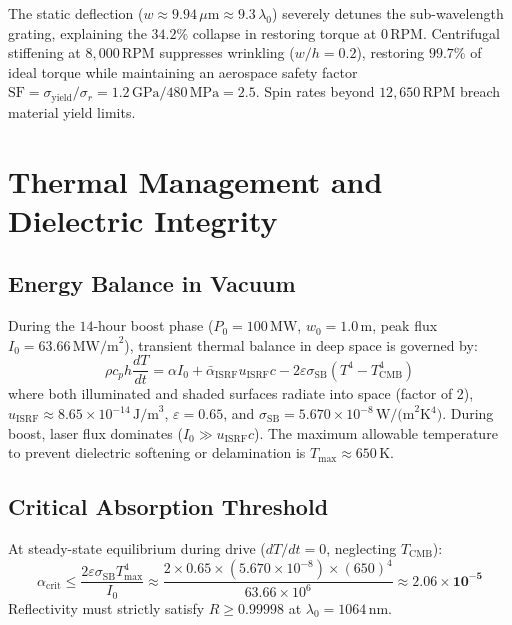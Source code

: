 \documentclass[11pt, a4paper]{article}
\begin{document}
The static deflection ($w \approx 9.94\,\mu\text{m} \approx 9.3\,\lambda_0$) severely detunes the sub-wavelength grating, explaining the $34.2\%$ collapse in restoring torque at $0\,\text{RPM}$. Centrifugal stiffening at $8,000\,\text{RPM}$ suppresses wrinkling ($w/h = 0.2$), restoring $99.7\%$ of ideal torque while maintaining an aerospace safety factor $\mathrm{SF} = \sigma_{\text{yield}} / \sigma_r = 1.2\,\text{GPa} / 480\,\text{MPa} = 2.5$. Spin rates beyond $12,650\,\text{RPM}$ breach material yield limits.

\section{Thermal Management and Dielectric Integrity}

\subsection{Energy Balance in Vacuum}
During the $14$-hour boost phase ($P_0 = 100\,\text{MW}$, $w_0 = 1.0\,\text{m}$, peak flux $I_0 = 63.66\,\text{MW/m}^2$), transient thermal balance in deep space is governed by:
\begin{equation}
    \rho c_p h \frac{dT}{dt} = \alpha I_0 + \bar{\alpha}_{\text{ISRF}} u_{\text{ISRF}} c - 2 \varepsilon \sigma_{\text{SB}} \left( T^4 - T_{\text{CMB}}^4 \right)
\end{equation}
where both illuminated and shaded surfaces radiate into space (factor of 2), $u_{\text{ISRF}} \approx 8.65 \times 10^{-14}\,\text{J/m}^3$, $\varepsilon = 0.65$, and $\sigma_{\text{SB}} = 5.670 \times 10^{-8}\,\text{W/(m}^2\text{K}^4)$. During boost, laser flux dominates ($I_0 \gg u_{\text{ISRF}} c$). The maximum allowable temperature to prevent dielectric softening or delamination is $T_{\max} \approx 650\,\text{K}$.

\subsection{Critical Absorption Threshold}
At steady-state equilibrium during drive ($dT/dt = 0$, neglecting $T_{\text{CMB}}$):
\begin{equation}
    \alpha_{\text{crit}} \le \frac{2 \varepsilon \sigma_{\text{SB}} T_{\max}^4}{I_0} \approx \frac{2 \times 0.65 \times (5.670 \times 10^{-8}) \times (650)^4}{63.66 \times 10^6} \approx \mathbf{2.06 \times 10^{-5}}
\end{equation}
Reflectivity must strictly satisfy $R \ge 0.99998$ at $\lambda_0 = 1064\,\text{nm}$.
\end{document}
